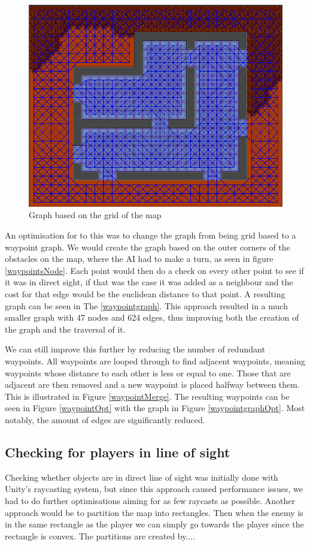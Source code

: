 \begin{figure}[H]
	\includegraphics[width=\textwidth]{figures/astar/gridGraph}
	\caption{Graph based on the grid of the map}
	\label{gridGraph}
\end{figure}

An optimisation for to this was to change the graph from being grid based to a waypoint graph.
We would create the graph based on the outer corners of the obstacles on the map, where the AI had to make a turn, as seen in figure \ref{waypointsNode}.
Each point would then do a check on every other point to see if it was in direct sight, if that was the case it was added as a neighbour and the cost for that edge would be the euclidean distance to that point.
A resulting graph can be seen in The  \ref{waypointgraph}.
This approach resulted in a much smaller graph with 47 nodes and 624 edges, thus improving both the creation of the graph and the traversal of it.

We can still improve this further by reducing the number of redundant waypoints.
All waypoints are looped through to find adjacent waypoints, meaning waypoints whose distance to each other is less or equal to one.
Those that are adjacent are then removed and a new waypoint is placed halfway between them.
This is illustrated in Figure \ref{waypointMerge}.
The resulting waypoints can be seen in Figure \ref{waypointOpt} with the graph in Figure \ref{waypointgraphOpt}.
Most notably, the amount of edges are significantly reduced.

\subsection*{Checking for players in line of sight}
Checking whether objects are in direct line of sight was initially done with Unity's raycasting system, but since this approach caused performance issues, we had to do further optimisations aiming for as few raycasts as possible.
Another approach would be to partition the map into rectangles.
Then when the enemy is in the same rectangle as the player we can simply go towards the player since the rectangle is convex.
The partitions are created by.... 

